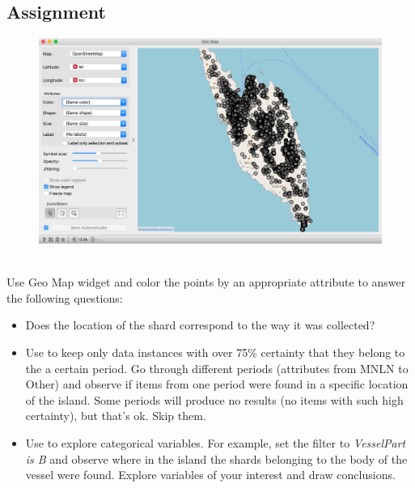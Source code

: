 \newpage

\subsection{Assignment}

\begin{figure}[h]
    \centering
    \includegraphics[scale=0.4]{geo-map.png}
    \caption{$\;$} %
\end{figure}

Use Geo Map widget and color the points by an appropriate attribute to answer the following questions:
\begin{itemize}
    \item Does the location of the shard correspond to the way it was collected?
    \item Use  to keep only data instances with over 75\% certainty that they belong to the a certain period. Go through different periods (attributes from MNLN to Other) and observe if items from one period were found in a specific location of the island. Some periods will produce no results (no items with such high certainty), but that's ok. Skip them.
    \item Use  to explore categorical variables. For example, set the filter to \textit{VesselPart is B} and observe where in the island the shards belonging to the body of the vessel were found. Explore variables of your interest and draw conclusions.
\end{itemize}
